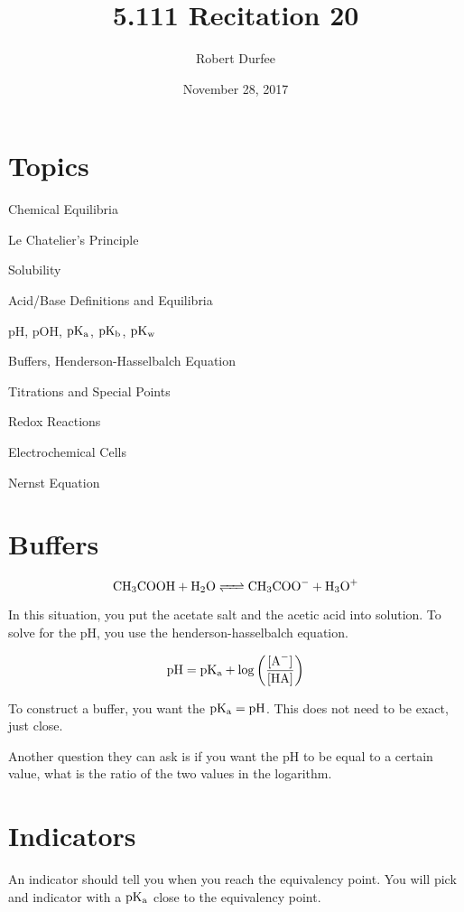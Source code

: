 \documentclass{article}
\title{ 5.111 Recitation 20 }
\author{ Robert Durfee }
\date{ November 28, 2017 }
\begin{document}
\maketitle

\section{ Topics }

Chemical Equilibria

Le Chatelier's Principle

Solubility

Acid/Base Definitions and Equilibria

pH, pOH, $\rm{ pK_{a} }$, $\rm{ pK_{b} }$, $\rm{ pK_{w} }$

Buffers, Henderson-Hasselbalch Equation

Titrations and Special Points

Redox Reactions

Electrochemical Cells

Nernst Equation

\section{ Buffers }

$$ \ce{ CH_{3}COOH + H_{2}O <=> CH_{3}COO- + H_{3}O+ } $$

In this situation, you put the acetate salt and the acetic acid into solution.
To solve for the pH, you use the henderson-hasselbalch equation.

$$ \rm{ pH } = \rm{ pK_{a} } + \log \left( \frac{ [ \ce{ A- } ] }{ [ \ce{ HA } ]
} \right) $$

To construct a buffer, you want the $\rm{ pK_{a} } = \rm{ pH }$. This does not
need to be exact, just close. 

Another question they can ask is if you want the pH to be equal to a certain
value, what is the ratio of the two values in the logarithm.

\section{ Indicators }

An indicator should tell you when you reach the equivalency point. You will pick
and indicator with a $ \rm{ pK_{a} }$ close to the equivalency point.
\end{document}
